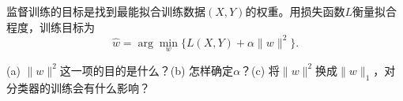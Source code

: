 监督训练的目标是找到最能拟合训练数据\((X,Y)\)的权重。用损失函数\(L\)衡量拟合程度，训练目标为
\[
\hat w=\arg\min_w\{L(X,Y)+\alpha\|w\|^2\}.
\]


(a) \(\|w\|^2\)这一项的目的是什么？(b) 怎样确定\(\alpha\)？(c) 将\(\|w\|^2\)换成\(\|w\|_1\)，对分类器的训练会有什么影响？
